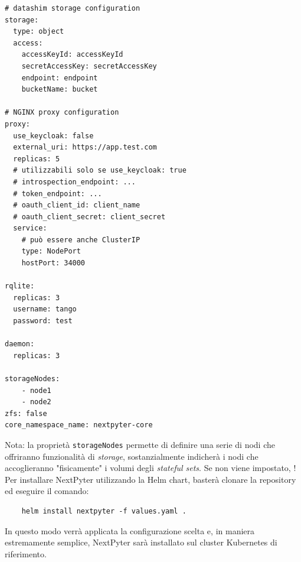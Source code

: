 \begin{verbatim}
# datashim storage configuration
storage:
  type: object
  access:
    accessKeyId: accessKeyId
    secretAccessKey: secretAccessKey
    endpoint: endpoint
    bucketName: bucket

# NGINX proxy configuration  
proxy: 
  use_keycloak: false
  external_uri: https://app.test.com
  replicas: 5
  # utilizzabili solo se use_keycloak: true
  # introspection_endpoint: ...
  # token_endpoint: ...
  # oauth_client_id: client_name
  # oauth_client_secret: client_secret
  service:
    # può essere anche ClusterIP
    type: NodePort
    hostPort: 34000

rqlite:
  replicas: 3
  username: tango
  password: test

daemon:
  replicas: 3

storageNodes:
    - node1
    - node2
zfs: false
core_namespace_name: nextpyter-core

\end{verbatim}
Nota: la proprietà \verb|storageNodes| permette di definire una serie di nodi che offriranno funzionalità di \textit{storage}, sostanzialmente indicherà i nodi che accoglieranno "fisicamente" i volumi degli \textit{stateful sets}. Se non viene impostato, !
\newline
Per installare NextPyter utilizzando la Helm chart, basterà clonare la repository ed eseguire il comando:
\begin{verbatim}
    helm install nextpyter -f values.yaml .
\end{verbatim}
In questo modo verrà applicata la configurazione scelta e, in maniera estremamente semplice, NextPyter sarà installato sul cluster Kubernetes di riferimento.
\newpage